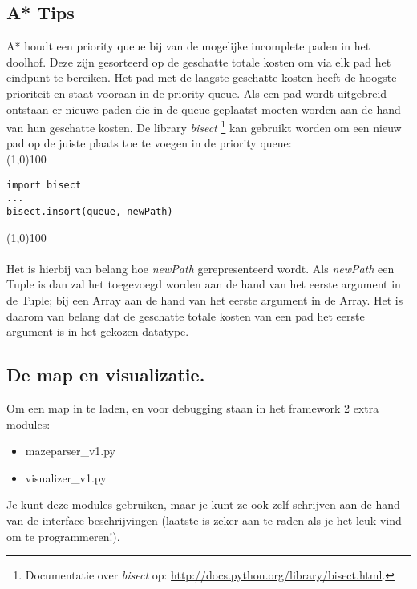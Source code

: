 \documentclass[a4paper]{article}
\begin{document}
\subsection{A* Tips}
A* houdt een priority queue bij van de mogelijke incomplete paden in het doolhof. Deze zijn gesorteerd op de geschatte totale kosten om via elk pad het eindpunt te bereiken. Het pad met de laagste geschatte kosten heeft de hoogste prioriteit en staat vooraan in de priority queue. Als een pad wordt uitgebreid ontstaan er nieuwe paden die in de queue geplaatst moeten worden aan de hand van hun geschatte kosten. De library \textit{bisect} \footnote{Documentatie over \textit{bisect} op: \url{http://docs.python.org/library/bisect.html}.} kan gebruikt worden om een nieuw pad op de juiste plaats toe te voegen in de priority queue:\\
\noindent \line(1,0){100}
\begin{verbatim}
import bisect
...
bisect.insort(queue, newPath)
\end{verbatim}
\noindent \line(1,0){100}
\\\\
Het is hierbij van belang hoe \textit{newPath} gerepresenteerd wordt. Als \textit{newPath} een Tuple is dan zal het toegevoegd worden aan de hand van het eerste argument in de Tuple; bij een Array aan de hand van het eerste argument in de Array. Het is daarom van belang dat de geschatte totale kosten van een pad het eerste argument is in het gekozen datatype. 

\subsection{De map en visualizatie.}
Om een map in te laden, en voor debugging staan in het framework 2 extra modules:
\begin{itemize}
\item mazeparser\_v1.py
\item visualizer\_v1.py
\end{itemize}

Je kunt deze modules gebruiken, maar je kunt ze ook zelf schrijven aan de hand van de interface-beschrijvingen (laatste is zeker aan te raden als je het leuk vind om te programmeren!).
\end{document}
